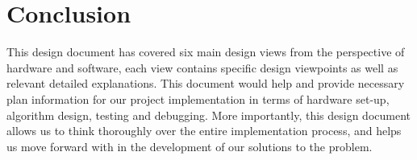 \section{Conclusion}
This design document has covered six main design views from the perspective of hardware and software, each view contains specific design viewpoints as well as relevant detailed explanations. This document would help and provide necessary plan information for our project implementation in terms of hardware set-up, algorithm design, testing and debugging. More importantly, this design document allows us to think thoroughly over the entire implementation process, and helps us move forward with in the development of our solutions to the problem.

































